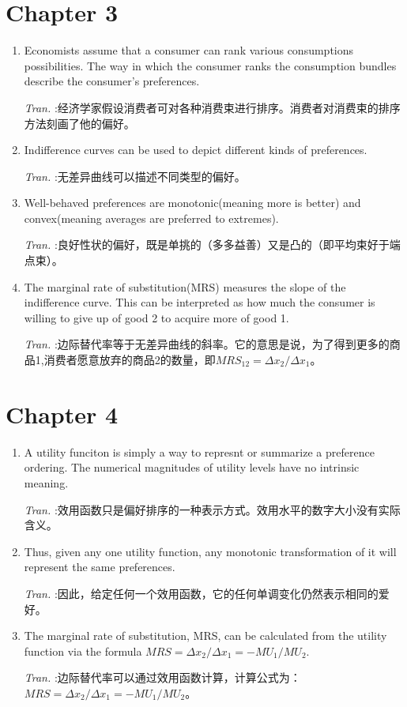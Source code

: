 \documentclass[11pt]{article}
\begin{document}
\section{Chapter 3}
\label{sec:org1bd34d7}
\begin{enumerate}
\item Economists assume that a consumer can rank various consumptions possibilities. The way in which the consumer ranks the consumption bundles describe the consumer's preferences.

\emph{Tran.} :经济学家假设消费者可对各种消费束进行排序。消费者对消费束的排序方法刻画了他的偏好。
\item Indifference curves can be used to depict different kinds of preferences.

\emph{Tran.} :无差异曲线可以描述不同类型的偏好。
\item Well-behaved preferences are monotonic(meaning more is better) and convex(meaning averages are preferred to extremes).

\emph{Tran.} :良好性状的偏好，既是单挑的（多多益善）又是凸的（即平均束好于端点束）。
\item The marginal rate of substitution(MRS) measures the slope of the indifference curve. This can be interpreted as how much the consumer is willing to give up of good 2 to acquire more of good 1.

\emph{Tran.} :边际替代率等于无差异曲线的斜率。它的意思是说，为了得到更多的商品1,消费者愿意放弃的商品2的数量，即\(MRS_{12} = \Delta x_{2}/\Delta x_{1}\)。
\end{enumerate}
\section{Chapter 4}
\label{sec:org174beaa}
\begin{enumerate}
\item A utility funciton is simply a way to represnt or summarize a preference ordering. The numerical magnitudes of utility levels have no intrinsic meaning.

\emph{Tran.} :效用函数只是偏好排序的一种表示方式。效用水平的数字大小没有实际含义。

\item Thus, given any one utility function, any monotonic transformation of it will represent the same preferences.

\emph{Tran.} :因此，给定任何一个效用函数，它的任何单调变化仍然表示相同的爱好。

\item The marginal rate of substitution, MRS, can be calculated from the utility function via the formula \(MRS=\Delta x_{2}/\Delta x_{1} = - MU_{1}/MU_{2}\).

\emph{Tran.} :边际替代率可以通过效用函数计算，计算公式为：\(MRS=\Delta x_{2}/\Delta x_{1} = - MU_{1}/MU_{2}\)。
\end{enumerate}
\end{document}
